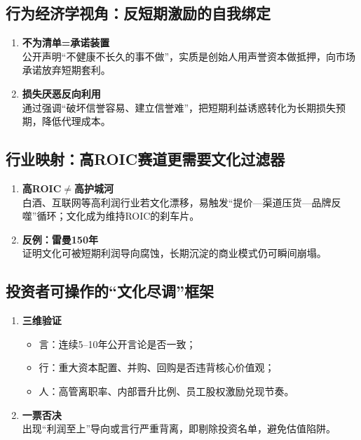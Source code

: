 \subsection{行为经济学视角：反短期激励的自我绑定}
\begin{enumerate}[leftmargin=*, nosep]
    \item \textbf{不为清单=承诺装置}  \\
    公开声明“不健康不长久的事不做”，实质是创始人用声誉资本做抵押，向市场承诺放弃短期套利。
    \item \textbf{损失厌恶反向利用}  \\
    通过强调“破坏信誉容易、建立信誉难”，把短期利益诱惑转化为长期损失预期，降低代理成本。
\end{enumerate}

\subsection{行业映射：高ROIC赛道更需要文化过滤器}
\begin{enumerate}[leftmargin=*, nosep]
    \item \textbf{高ROIC$\neq$高护城河}  \\
    白酒、互联网等高利润行业若文化漂移，易触发“提价—渠道压货—品牌反噬”循环；文化成为维持ROIC的刹车片。
    \item \textbf{反例：雷曼150年}  \\
    证明文化可被短期利润导向腐蚀，长期沉淀的商业模式仍可瞬间崩塌。
\end{enumerate}

\subsection{投资者可操作的“文化尽调”框架}
\begin{enumerate}[leftmargin=*, nosep]
    \item \textbf{三维验证}  
    \begin{itemize}[nosep]
        \item 言：连续5–10年公开言论是否一致；  
        \item 行：重大资本配置、并购、回购是否违背核心价值观；  
        \item 人：高管离职率、内部晋升比例、员工股权激励兑现节奏。
    \end{itemize}
    \item \textbf{一票否决}  \\
    出现“利润至上”导向或言行严重背离，即剔除投资名单，避免估值陷阱。
\end{enumerate}

